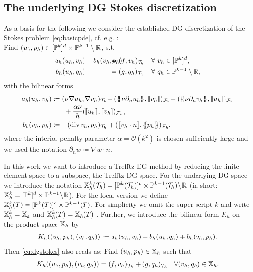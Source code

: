 \documentclass[pdflatex,sn-mathphys,Numbered]{sn-jnl}%
\theoremstyle{remark}%
\theoremstyle{definition}%
\begin{document}
\subsection{The underlying DG Stokes discretization} \label{sec:underlyingDG}
As a basis for the following we consider the established DG discretization of the Stokes problem \eqref{eq:basicpde}, cf. e.g. \cite[Section 6.1.5]{di2011mathematical}: \\
Find $(u_h, p_h) \in [\mathbb{P}^k]^d \times \mathbb{P}^{k-1}\setminus \mathbb{R}$, s.t.
\begin{subequations}\label{eq:dgstokes}
\begin{align}
a_h(u_h,v_h) &+ b_h(v_h,p_h) &\hspace*{-1cm}&= (f,v_h)_{\Th} && \forall ~ v_h \in [\PP^k]^d,\\
  b_h(u_h,q_h) &  &\hspace*{-1cm}&= (g,q_h)_{\Th} && \forall ~ q_h \in \PP^{k-1}\setminus \RR,
  \end{align}
\end{subequations}
with the bilinear forms
\begin{align*}
  a_h(u_h,v_h) &\coloneqq (\nu\! \Grad\! u_h,\Grad\! v_h)_\Th\! - (\avg{ \nu \partial_n u_h },\jmp{v_h})_\Fh\! - (\avg{\nu \partial_n v_h},\jmp{u_h})_\Fh  \\ & \qquad \!+ \frac{\alpha \nu }{h} (\jmp{u_h},\jmp{v_h})_\Fh, \\ 
b_h(v_h,p_h) &\coloneqq -(\Div v_h, p_h)_{\Th} + (\jmp{v_h \cdot n}, \avg{p_h})_{\Fh},
\end{align*}
where the interior penalty parameter $\alpha = \mathcal{O}(k^2)$ is
chosen sufficiently large and we used the notation $\partial_n w \coloneqq \nabla w \cdot
n$.

In this work we want to introduce a Trefftz-DG method by reducing the
finite element space to a subspace, the Trefftz-DG space. For the
underlying DG space we introduce the notation $\mathbb{X}^k_h({\mathcal{T}_h}) =
[\mathbb{P}^k({\mathcal{T}_h})]^d \times \mathbb{P}^{k-1}({\mathcal{T}_h}) \!\setminus\! \mathbb{R}$ (in short:
$\mathbb{X}^k_h = [\mathbb{P}^k]^d \times \mathbb{P}^{k-1} \!\setminus\! \mathbb{R}$). For the
local version we define $\mathbb{X}^k_h(T) = [\mathbb{P}^k(T)]^d \times
\mathbb{P}^{k-1}(T)$. For simplicity we omit the super script $k$ and write
$\mathbb{X}^k_h = \mathbb{X}_h$ and $\mathbb{X}^k_h(T) = \mathbb{X}_h(T)$ . Further, we introduce the
bilinear form $K_h$ on the product space $\mathbb{X}_h$ by
\begin{equation} \label{eq:K}
  K_h((u_h,p_h),(v_h,q_h)) := a_h(u_h,v_h) + b_h(u_h,q_h) + b_h(v_h,p_h).
\end{equation}
Then \eqref{eq:dgstokes} also reads as: Find $(u_h,p_h) \in \mathbb{X}_h$ such that
\begin{align} \label{eq:DGK}
  K_h((u_h,p_h),(v_h,q_h)) = (f,v_h)_{{\mathcal{T}_h}} + (g,q_h)_{{\mathcal{T}_h}} \quad \forall (v_h,q_h) \in \mathbb{X}_h.
\end{align}
\end{document}
